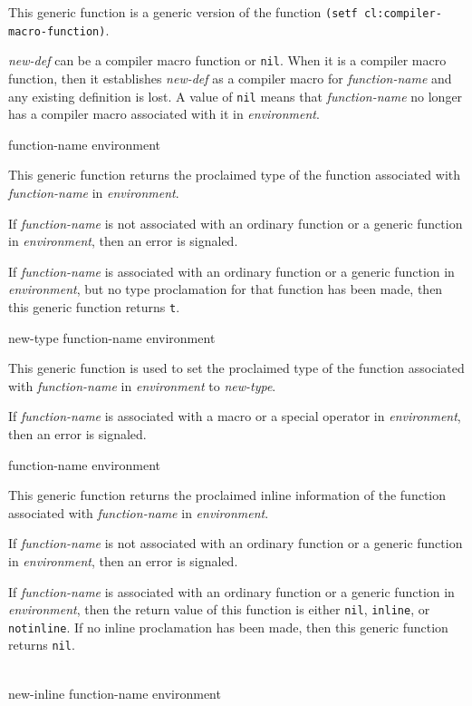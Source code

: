 This generic function is a generic version of the \commonlisp{}
function \texttt{(setf cl:compiler-macro-function)}.

\textit{new-def} can be a compiler macro function or \texttt{nil}.
When it is a compiler macro function, then it establishes
\textit{new-def} as a compiler macro for \textit{function-name} and
any existing definition is lost.  A value of \texttt{nil} means that
\textit{function-name} no longer has a compiler macro associated with
it in \textit{environment}.

 {function-name environment}

This generic function returns the proclaimed type of the function
associated with \textit{function-name} in \textit{environment}.

If \textit{function-name} is not associated with an ordinary function
or a generic function in \textit{environment}, then an error is
signaled.

If \textit{function-name} is associated with an ordinary function or a
generic function in \textit{environment}, but no type proclamation for
that function has been made, then this generic function returns
\texttt{t}.

 {new-type function-name environment}

This generic function is used to set the proclaimed type of the
function associated with \textit{function-name} in
\textit{environment} to \textit{new-type}.

If \textit{function-name} is associated with a macro or a special
operator in \textit{environment}, then an error is signaled.

 {function-name environment}

This generic function returns the proclaimed inline information of the
function associated with \textit{function-name} in
\textit{environment}.

If \textit{function-name} is not associated with an ordinary function
or a generic function in \textit{environment}, then an error is
signaled.

If \textit{function-name} is associated with an ordinary function or a
generic function in \textit{environment}, then the return value of
this function is either \texttt{nil}, \texttt{inline}, or
\texttt{notinline}.  If no inline proclamation has been made, then
this generic function returns \texttt{nil}.

\\
{new-inline function-name environment}

